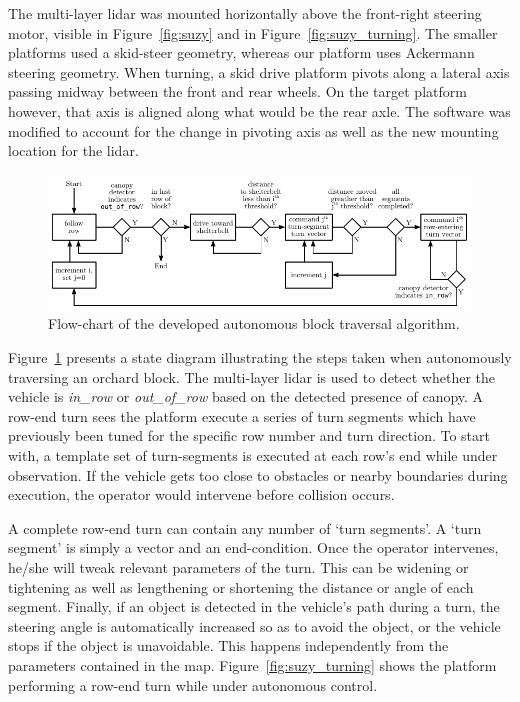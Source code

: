 \documentclass[preprint,authoryear,12pt]{elsarticle}
\begin{document}
    The multi-layer lidar was mounted horizontally above the front-right steering motor, visible in Figure~\ref{fig:suzy} and in Figure~\ref{fig:suzy_turning}.
    The smaller platforms used a skid-steer geometry, whereas our platform uses Ackermann steering geometry.
    When turning, a skid drive platform pivots along a lateral axis passing midway between the front and rear wheels.
    On the target platform however, that axis is aligned along what would be the rear axle.
    The software was modified to account for the change in pivoting axis as well as the new mounting location for the lidar.

    \begin{figure}[htb]
        \centering
        \includegraphics[width=\linewidth]{images/flowchart.pdf}
        \caption{
            Flow-chart of the developed autonomous block traversal algorithm.
        }
        \label{fig:turn_diagram}
    \end{figure}

    Figure~\ref{fig:turn_diagram} presents a state diagram illustrating the steps taken when autonomously traversing an orchard block.
    The multi-layer lidar is used to detect whether the vehicle is \textit{in\_row} or \textit{out\_of\_row} based on the detected presence of canopy.
    A row-end turn sees the platform execute a series of turn segments which have previously been tuned for the specific row number and turn direction.
    To start with, a template set of turn-segments is executed at each row's end while under observation.
    If the vehicle gets too close to obstacles or nearby boundaries during execution, the operator would intervene before collision occurs.

    A complete row-end turn can contain any number of `turn segments'.
    A `turn segment' is simply a vector and an end-condition.
    Once the operator intervenes, he/she will tweak relevant parameters of the turn.
    This can be widening or tightening as well as lengthening or shortening the distance or angle of each segment.
    Finally, if an object is detected in the vehicle's path during a turn, the steering angle is automatically increased so as to avoid the object, or the vehicle stops if the object is unavoidable.
    This happens independently from the parameters contained in the map.
    Figure~\ref{fig:suzy_turning} shows the platform performing a row-end turn while under autonomous control.
\end{document}
